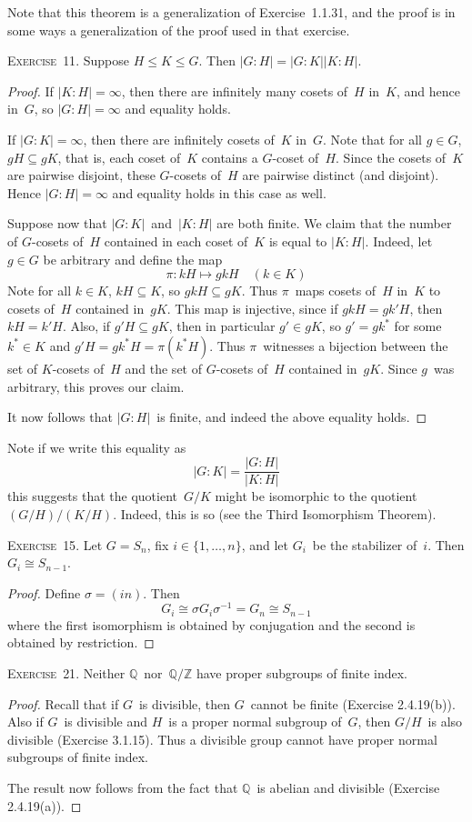 \documentclass[letterpaper]{article}
\newcommand{\exercise}[1]{\goodbreak\noindent\textsc{Exercise~{#1}.}}
\newcommand{\Z}{\mathbb{Z}}
\newcommand{\Q}{\mathbb{Q}}
\newcommand{\iso}{\cong}
\newcommand{\subgroup}{\le}
\newcommand{\gindex}[2]{|{#1}:{#2}|}
\begin{document}
\noindent Note that this theorem is a generalization of Exercise~1.1.31, and the proof is in some ways a generalization of the proof used in that exercise.

\bigskip
\exercise{11}
Suppose $H\subgroup K\subgroup G$. Then $\gindex{G}{H}=\gindex{G}{K}\gindex{K}{H}$.
\begin{proof}
If $\gindex{K}{H}=\infty$, then there are infinitely many cosets of~$H$ in~$K$, and hence in~$G$, so $\gindex{G}{H}=\infty$ and equality holds.

If $\gindex{G}{K}=\infty$, then there are infinitely cosets of~$K$ in~$G$. Note that for all $g\in G$, $gH\subseteq gK$, that is, each coset of~$K$ contains a $G$-coset of~$H$. Since the cosets of~$K$ are pairwise disjoint, these $G$-cosets of~$H$ are pairwise distinct (and disjoint). Hence $\gindex{G}{H}=\infty$ and equality holds in this case as well.

Suppose now that $\gindex{G}{K}$~and~$\gindex{K}{H}$ are both finite. We claim that the number of $G$-cosets of~$H$ contained in each coset of~$K$ is equal to $\gindex{K}{H}$. Indeed, let $g\in G$ be arbitrary and define the map
$$\pi:kH\mapsto gkH\quad(k\in K)$$
Note for all $k\in K$, $kH\subseteq K$, so $gkH\subseteq gK$. Thus $\pi$~maps cosets of~$H$ in~$K$ to cosets of~$H$ contained in~$gK$. This map is injective, since if $gkH=gk'H$, then $kH=k'H$. Also, if $g'H\subseteq gK$, then in particular $g'\in gK$, so $g'=gk^*$ for some $k^*\in K$ and $g'H=gk^*H=\pi(k^*H)$. Thus $\pi$~witnesses a bijection between the set of $K$-cosets of~$H$ and the set of $G$-cosets of~$H$ contained in~$gK$. Since $g$~was arbitrary, this proves our claim.

It now follows that $\gindex{G}{H}$~is finite, and indeed the above equality holds.
\end{proof}
\noindent Note if we write this equality as
$$\gindex{G}{K}=\frac{\gindex{G}{H}}{\gindex{K}{H}}$$
this suggests that the quotient~$G/K$ might be isomorphic to the quotient $(G/H)/(K/H)$. Indeed, this is so (see the Third Isomorphism Theorem).

\bigskip
\exercise{15}
Let $G=S_n$, fix $i\in\{1,\ldots,n\}$, and let $G_i$~be the stabilizer of~$i$. Then $G_i\iso S_{n-1}$.
\begin{proof}
Define $\sigma=(in)$. Then
$$G_i\iso\sigma G_i\sigma^{-1}=G_n\iso S_{n-1}$$
where the first isomorphism is obtained by conjugation and the second is obtained by restriction.
\end{proof}

\exercise{21}
Neither $\Q$~nor~$\Q/\Z$ have proper subgroups of finite index.
\begin{proof}
Recall that if $G$~is divisible, then $G$~cannot be finite (Exercise 2.4.19(b)). Also if $G$~is divisible and $H$~is a proper normal subgroup of~$G$, then $G/H$~is also divisible (Exercise 3.1.15). Thus a divisible group cannot have proper normal subgroups of finite index.

The result now follows from the fact that $\Q$~is abelian and divisible (Exercise 2.4.19(a)).
\end{proof}
\end{document}
